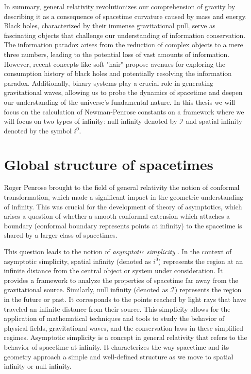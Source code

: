 In summary, general relativity revolutionizes our comprehension of gravity by describing it as a consequence of spacetime curvature caused by mass and energy. Black holes, characterized by their immense gravitational pull, serve as fascinating objects that challenge our understanding of information conservation. The information paradox arises from the reduction of complex objects to a mere three numbers, leading to the potential loss of vast amounts of information. However, recent concepts like soft "hair" propose avenues for exploring the consumption history of black holes and potentially resolving the information paradox. Additionally, binary systems play a crucial role in generating gravitational waves, allowing us to probe the dynamics of spacetime and deepen our understanding of the universe's fundamental nature. In this thesis we will focus on the calculation of Newman-Penrose constants on a framework where we will focus on two types of infinity: null infinity denoted by $\mathscr{I}$ and spatial infinity denoted by the symbol $i^0$.


\section{Global structure of spacetimes}
\label{section:Global structure of spacetimes}

Roger Penrose brought to the field of general relativity the notion of conformal transformation, which made a significant impact in the geometric understanding of infinity. This was crucial for the development of theory of asymptotics, which arises a question of whether a smooth conformal extension which attaches a boundary (conformal boundary represents points at infinity) to the spacetime is shared by a larger class of spacetimes. 

This question leads to the notion of \textit{asymptotic simplicity} \cite{Val16}. In the context of asymptotic simplicity, spatial infinity (denoted as $i^0$) represents the region at an infinite distance from the central object or system under consideration. It provides a framework to analyze the properties of spacetime far away from the gravitational source. Similarly, null infinity (denoted as $\mathscr{I}$) represents the region in the future or past. It corresponds to the points reached by light rays that have traveled an infinite distance from their source. This simplicity allows for the application of mathematical techniques and tools to study the behavior of physical fields, gravitational waves, and the conservation laws in these simplified regimes.
Asymptotic simplicity is a concept in general relativity that refers to the behavior of spacetime at infinity. It characterizes the way spacetime and its geometry approach a simple and well-defined structure as we move to spatial infinity or null infinity. 

